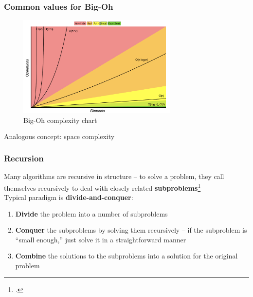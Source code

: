\documentclass{beamer}
\begin{document}

\begin{frame}
	\frametitle{Common values for Big-Oh}
	\begin{figure}
		\includegraphics[width=8cm]{./bigo.png}
		\caption{Big-Oh complexity chart}
	\end{figure}
	Analogous concept: space complexity
\end{frame}

\begin{frame}
	\frametitle{Recursion}
	Many algorithms are recursive in structure -- to solve a problem, they call themselves recursively to deal with closely related \textbf{subproblems}\footcite{clrs}\\
	\vspace{1em}
	Typical paradigm is \textbf{divide-and-conquer}:
	\begin{enumerate}
		\item
			\textbf{Divide} the problem into a number of subproblems
		\item
			\textbf{Conquer} the subproblems by solving them recursively -- if the subproblem is ``small enough,'' just solve it in a straightforward manner
		\item
			\textbf{Combine} the solutions to the subproblems into a solution for the original problem
	\end{enumerate}
\end{frame}
\end{document}
